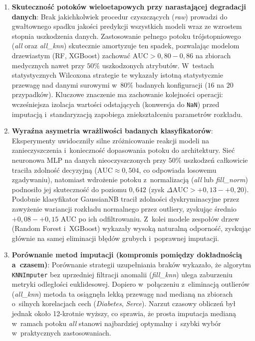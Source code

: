 \begin{enumerate}
    \item \textbf{Skuteczność potoków wieloetapowych przy narastającej degradacji danych}:  
    Brak jakichkolwiek procedur czyszczących (\textit{raw}) prowadzi do gwałtownego spadku jakości predykcji wszystkich modeli wraz ze wzrostem stopnia uszkodzenia danych. Zastosowanie pełnego potoku trójstopniowego (\textit{all} oraz \textit{all\_knn}) skutecznie amortyzuje ten spadek, pozwalając modelom drzewiastym (RF, XGBoost) zachować $\mathrm{AUC} > 0{,}80 - 0{,}86$ na zbiorach medycznych nawet przy $50\%$ uszkodzonych atrybutów. W~testach statystycznych Wilcoxona strategie te wykazały istotną statystycznie przewagę nad danymi surowymi w~$80\%$ badanych konfiguracji ($16$ na $20$ przypadków). Kluczowe znaczenie ma zachowanie kolejności operacji: wcześniejsza izolacja wartości odstających (konwersja do \texttt{NaN}) przed imputacją i~standaryzacją zapobiega zniekształceniu parametrów rozkładu.

    \item \textbf{Wyraźna asymetria wrażliwości badanych klasyfikatorów}:  
    Eksperymenty uwidoczniły silne zróżnicowanie reakcji modeli na zanieczyszczenia i~konieczność dopasowania potoku do architektury. Sieć neuronowa MLP na danych nieoczyszczonych przy $50\%$ uszkodzeń całkowicie traciła zdolność decyzyjną ($\mathrm{AUC} \approx 0{,}504$, co odpowiada losowemu zgadywaniu), natomiast wdrożenie potoku z~normalizacją (\textit{all} lub \textit{fill\_norm}) podnosiło jej skuteczność do poziomu $0{,}642$ (zysk $\Delta \mathrm{AUC} > +0{,}13 - +0{,}20$). Podobnie klasyfikator GaussianNB tracił zdolności dyskryminacyjne przez zawyżenie wariancji rozkładu normalnego przez outliery, zyskując średnio $+0{,}08 - +0{,}15$ AUC po ich odfiltrowaniu. Z~kolei modele zespołów drzew (Random Forest i~XGBoost) wykazały wysoką naturalną odporność, zyskując głównie na samej eliminacji błędów grubych i~poprawnej imputacji.

    \item \textbf{Porównanie metod imputacji (kompromis pomiędzy dokładnością a~czasem)}:  
    Porównanie strategii uzupełniania braków wykazało, że algorytm \texttt{KNNImputer} bez uprzedniej filtracji anomalii (\textit{fill\_knn}) ulega zaburzeniu metryki odległości euklidesowej. Dopiero w~połączeniu z~eliminacją outlierów (\textit{all\_knn}) metoda ta osiągnęła lekką przewagę nad medianą na zbiorach o~silnych korelacjach cech (\textit{Diabetes}, \textit{Serce}). Narzut czasowy obliczeń był jednak około 12-krotnie wyższy, co sprawia, że prosta imputacja medianą w~ramach potoku \textit{all} stanowi najbardziej optymalny i~szybki wybór w~praktycznych zastosowaniach.
\end{enumerate}

